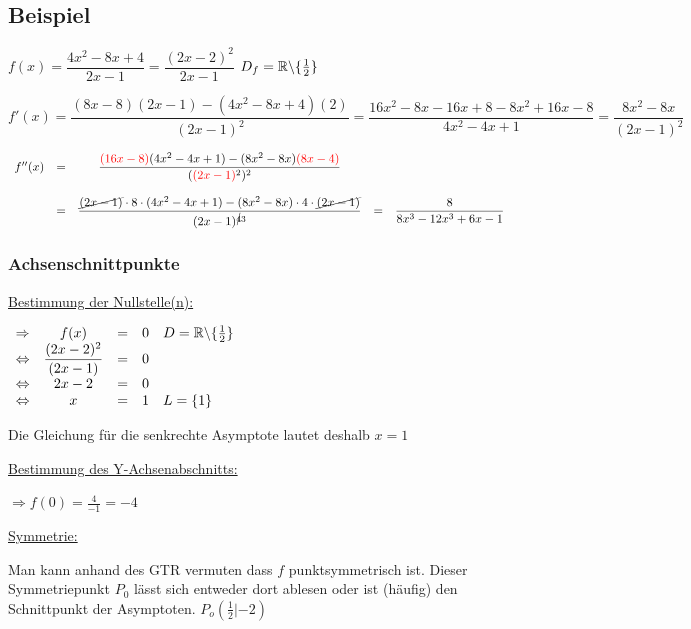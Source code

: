 \documentclass[main.tex]{subfiles}
\begin{document}
\subsection{Beispiel}

$f(x) = \dfrac{4x^2 -8x +4}{2x-1} = \dfrac{(2x-2)^2}{2x-1}$ \qquad \qquad $D_{f}=\mathbb{R} \backslash \{ \frac{1}{2} \}$

$f'(x) = \dfrac{(8x-8)(2x-1)-(4x^2-8x+4)(2)}{(2x-1)^2} = \dfrac{16x^2-8x-16x+8-8x^2+16x-8}{4x^2-4x+1} = \dfrac{8x^2-8x}{(2x-1)^2}$

$\begin{array}{rcccl}
	f''(x)  & = & \dfrac{\textcolor{red}{(16x-8)}(4x^2-4x+1)-(8x^2-8x)\textcolor{red}{(8x-4)}}{(\textcolor{red}{(2x-1)}^2)^2}\\ \\
	& = & \dfrac{\cancel{(2x-1)}\cdot 8 \cdot (4x^2-4x+1) - (8x^2-8x)\cdot 4 \cdot \cancel{(2x-1)}}{(2x-1)^{\cancel{4} 3}} & = & \dfrac{8}{8x^3-12x^3+6x-1} \\
\end{array}$


\subsubsection{Achsenschnittpunkte}

\underline{Bestimmung der Nullstelle(n):}

$\begin{array}{rcccl}
	\Rightarrow    &    f(x)    &    =    &    0 & D=\mathbb{R} \backslash \{ \frac{1}{2} \} \\
	\Leftrightarrow    &    \dfrac{(2x-2)^2}{(2x-1)}     &     =     &      0\\
	\Leftrightarrow    &    2x-2     &     =     &     0\\
	\Leftrightarrow    &    x      &    =     &     1   &  L = \{ 1 \}     \\
\end{array}$

Die Gleichung für die senkrechte Asymptote lautet deshalb $x=1$

\underline{Bestimmung des Y-Achsenabschnitts:}

$\Rightarrow f(0) = \frac{4}{-1} = -4$

\underline{Symmetrie:}

Man kann anhand des GTR vermuten dass $f$ punktsymmetrisch ist. Dieser Symmetriepunkt $P_{0}$ lässt sich entweder dort ablesen oder ist (häufig) den Schnittpunkt der Asymptoten. $P_{o}(\frac{1}{2}|-2)$
\end{document}

